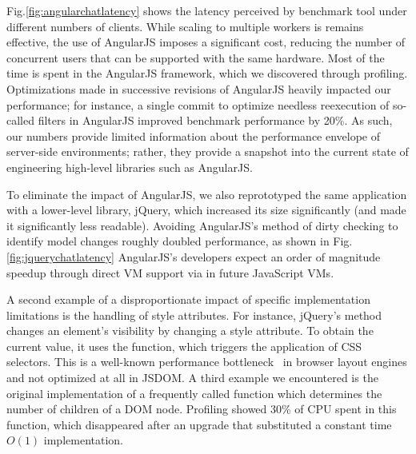 Fig.\ref{fig:angularchatlatency} shows the latency perceived by benchmark tool
under different numbers of clients.  While scaling to multiple workers is remains effective,
the use of AngularJS imposes a significant cost, reducing the number of concurrent users 
that can be supported with the same hardware.  Most of the time is spent in the AngularJS
framework, which we discovered through profiling.  Optimizations made in successive revisions
of AngularJS heavily impacted our performance; for instance, a single commit to optimize
needless reexecution of so-called filters in AngularJS improved benchmark performance by 20\%.
As such, our numbers provide limited information about the performance envelope of
server-side environments; rather, they provide a snapshot into the current state of
engineering high-level libraries such as AngularJS.  

\jquerychatlatency{}
To eliminate the impact of AngularJS, we also reprototyped the same application with a
lower-level library, jQuery, which increased its size significantly (and made it significantly
less readable).  Avoiding AngularJS's method of dirty checking to identify model changes
roughly doubled performance, as shown in Fig.\ref{fig:jquerychatlatency}
AngularJS's developers expect an order of magnitude speedup through direct VM 
support via  in future JavaScript VMs\cite{angularjsspeedup}.

A second example of a disproportionate impact of specific implementation limitations
is the handling of style attributes.  For instance, jQuery's  method changes an element's
visibility by changing a style attribute.  To obtain the current value, it uses the
 function, which triggers the application of CSS selectors.
This is a well-known performance bottleneck~\cite{Meyerovich+:WWW2010} in browser
layout engines and not optimized at all in JSDOM.  A third example we encountered 
is the original implementation of a frequently called function 
which determines the number of children of a DOM node.  Profiling showed 30\% of CPU
spent in this function, which disappeared after an upgrade that substituted a
constant time $O(1)$ implementation.

